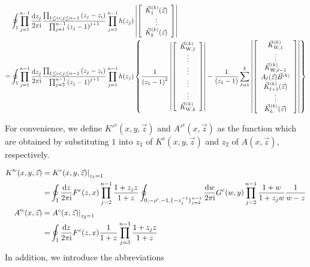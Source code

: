 \documentclass[cmp]{svjour}
\numberwithin{theorem}{section}
\numberwithin{equation}{section}
\def\dd{{\rm d}}
\def\ii{{\rm i}}
\begin{document}
\begin{equation}
\label{eq:rank1lem2_2}
\begin{split}
& \oint_{1} \prod_{j=1}^{n-1}{ \frac{\dd z_j}{2 \pi \ii} } \frac{ \prod_{1 \leq i < j \leq n-1}{(z_j - z_i)} }{ \prod_{j=1}^{n-1}{{(z_j -1)}^{j+1}} } \prod_{j=1}^{n-1}{h(z_j)} 
\left|
\left[
\begin{array}{c}
\vec{K}^{(k)}_{1}(\vec{z})  \\
\vdots \\
\vec{K}^{(k)}_{k}(\vec{z}) 
\end{array}
\right]
\right| \\
= & \oint_{1} \prod_{j=1}^{n-1}{ \frac{\dd z_j}{2 \pi \ii} } \frac{ \prod_{1 \leq i < j \leq n-1}{(z_j - z_i)}  }{ \prod_{j=2}^{n-1}{{(z_j -1)}^{j+1}} } \prod_{j=1}^{n-1}{h(z_j)} \left\{
\frac{1}{{(z_1 - 1)}^2}
\left|
\left[
\begin{array}{c}
\vec{K}^{(k)}_{\mathrm{W} ,1}  \\
\vdots \\
\vdots \\
\vdots \\
\vdots \\
\vec{K}^{(k)}_{\mathrm{W}, k} 
\end{array}
\right]
\right|  -  \frac{1}{(z_1 - 1)} \sum_{\ell =1}^{k}{
\left|
\left[
\begin{array}{c}
\vec{K}^{(k)}_{\mathrm{W} ,1} \\
\vdots \\
\vec{K}^{(k)}_{\mathrm{W} ,\ell -1} \\
 A_\ell (\vec{z}) \vec{B}^{(k)} \\
\vec{K}^{(k)}_{\ell +1}(\vec{z})  \\
\vdots  \\
\vec{K}^{(k)}_{k}(\vec{z})
\end{array}
\right]
\right| } \right\}
\end{split}
\end{equation}

For convenience, we define $K'^c(x,y, \vec{z})$ and $A'^c(x, \vec{z})$ as the function which are obtained by substituting $1$ into $z_1$ of $K^c(x,y, \vec{z})$ and $z_2$ of $A(x, \vec{z})$, respectively.

\begin{equation*}
\begin{split}
K'^c(x,y, \vec{z}) = & \left. K^c(x,y,\vec{z}) \right|_{z_1 = 1} \\
= & \oint_{1} \frac{\dd z}{2 \pi \ii} F^c(z, x) \prod_{j=2}^{n-1}{ \frac{1 + z_j z}{1 + z} } \oint_{0 , - \rho' , -1 ,  \{ - z_j^{-1} \}_{j=2}^{n-1} } \frac{\dd w}{2 \pi \ii} G^c(w, y) \prod_{j=2}^{n-1}{\frac{1 + w}{1 + z_j w}} \frac{1}{w-z} \\
A'^c(x, \vec{z}) = & \left. A^c(x,\vec{z}) \right|_{z_2 = 1} \\
= & \oint_{1} \frac{ \dd z }{2 \pi \ii} F^c(z, x) \frac{1}{1 + z} \prod_{j=3}^{n-1}{ \frac{1 + z_j z}{1 + z} }
\end{split}
\end{equation*}
In addition, we introduce the abbreviations
\end{document}
